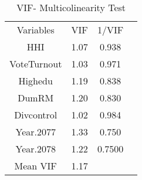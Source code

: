 \begin{table}[ht]
\centering
\begin{tabular}{cccc}

     Variables & VIF & 1/VIF \\ 
HHI & 1.07 &0.938    \\ 
VoteTurnout & 1.03& 0.971  \\ 
Highedu & 1.19 & 0.838  \\ 
DumRM &1.20 & 0.830 \\ 
Divcontrol &1.02 & 0.984 \\ 
Year.2077 & 1.33& 0.750\\
Year.2078 & 1.22 & 0.7500\\
Mean VIF & 1.17 & \\
\end{tabular}
\caption{VIF- Multicolinearity Test}
\label{VIF- Multicolinearity Test}
\end{table}
